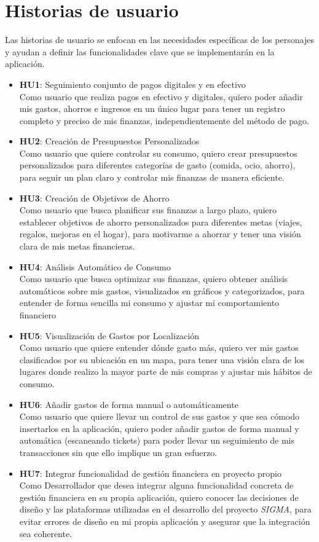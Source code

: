 \section{Historias de usuario}
Las historias de usuario se enfocan en las necesidades específicas de los personajes y ayudan a definir las funcionalidades clave que se implementarán en la aplicación.

\begin{itemize}
    \item \textbf{HU1}: Seguimiento conjunto de pagos digitales y en efectivo\\
    Como usuario que realiza pagos en efectivo y digitales,
    quiero poder añadir mis gastos, ahorros e ingresos en un único lugar
    para tener un registro completo y preciso de mis finanzas, independientemente del método de pago.
    \item \textbf{HU2}: Creación de Presupuestos Personalizados\\
    Como usuario que quiere controlar su consumo,
    quiero crear presupuestos personalizados para diferentes categorías de gasto (comida, ocio, ahorro),
    para seguir un plan claro y controlar mis finanzas de manera eficiente.
    \item \textbf{HU3}: Creación de Objetivos de Ahorro\\
    Como usuario que busca planificar sus finanzas a largo plazo,
    quiero establecer objetivos de ahorro personalizados para diferentes metas (viajes, regalos, mejoras en el hogar),
    para motivarme a ahorrar y tener una visión clara de mis metas financieras.
    \item \textbf{HU4}: Análisis Automático de Consumo\\
    Como usuario que busca optimizar sus finanzas,
    quiero obtener análisis automáticos sobre mis gastos, visualizados en gráficos y categorizados,
    para entender de forma sencilla mi consumo y ajustar mi comportamiento financiero
    \item \textbf{HU5}: Visualización de Gastos por Localización\\
    Como usuario que quiere entender dónde gasto más,
    quiero ver mis gastos clasificados por su ubicación en un mapa,
    para tener una visión clara de los lugares donde realizo la mayor parte de mis compras y ajustar mis hábitos de consumo.
    \item \textbf{HU6}: Añadir gastos de forma manual o automáticamente\\ 
    Como usuario que quiere llevar un control de sus gastos y que sea cómodo insertarlos en la aplicación, quiero poder añadir gastos de forma manual y automática (escaneando tickets) para poder llevar un seguimiento de mis transacciones sin que ello implique un gran esfuerzo.
    \item \textbf{HU7}: Integrar funcionalidad de gestión financiera en proyecto propio\\
    Como Desarrollador que desea integrar alguna funcionalidad concreta de gestión financiera en su propia aplicación, quiero conocer las decisiones de diseño y las plataformas utilizadas en el desarrollo del proyecto \textit{SIGMA}, para evitar errores de diseño en mi propia aplicación y asegurar que la integración sea coherente.
    

\end{itemize}
